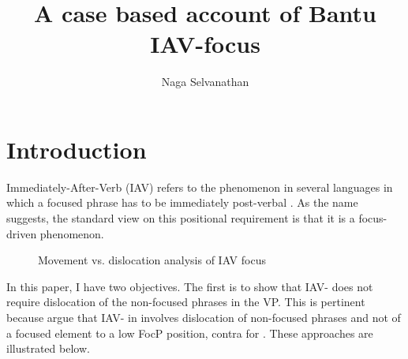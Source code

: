 \documentclass[output=paper,newtxmath,modfonts,nonflat,draft]{langsci/langscibook}
\title{A case based account of Bantu IAV-focus}
\author{Naga Selvanathan\affiliation{Rutgers University}}
\begin{document}
\maketitle
\section{Introduction}

 Immediately-After-Verb (IAV)  refers to the phenomenon in several  languages in which a focused phrase has to be immediately post-verbal \citep{hyman1979nounstructure,watters1979}. As the name suggests, the standard view on this positional requirement is that it is a focus-driven phenomenon. 

\begin{figure}
\caption{Movement vs. dislocation analysis of IAV focus}
\label{fig:selvanathan:1}
%
%


\end{figure} 


 In this paper, I have two objectives. The first is to show that  IAV- does not require dislocation of the non-focused phrases in the VP. This is pertinent because \citet{chengdowning2012} argue that IAV- in  involves dislocation of non-focused phrases and not  of a focused element to a low FocP position, contra \citet{vanderwal2006} for . These approaches are illustrated below.
\end{document}
